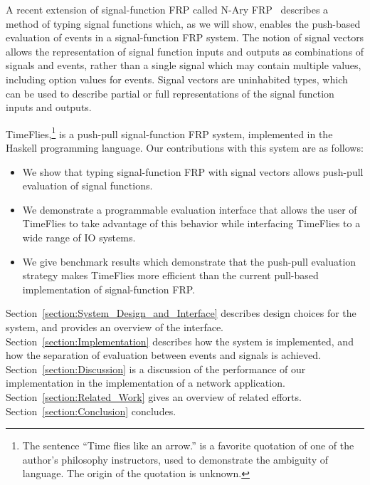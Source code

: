 A recent extension of signal-function FRP called N-Ary FRP~\cite{Sculthorpe2011}
describes a method of typing signal functions which, as we will show, enables
the push-based evaluation of events in a signal-function FRP system. The notion
of signal vectors allows the representation of signal function inputs and
outputs as combinations of signals and events, rather than a single signal which
may contain multiple values, including option values for events. Signal vectors
are uninhabited types, which can be used to describe partial or full
representations of the signal function inputs and outputs.

TimeFlies,\footnote{The sentence ``Time flies like an arrow.'' is a 
favorite quotation of one of the author's philosophy instructors, used to
demonstrate the ambiguity of language. The origin of the quotation is unknown.}
is a push-pull signal-function FRP system, implemented in the Haskell
programming language. Our contributions with this system are as follows:

\begin{itemize}
  \item We show that typing signal-function FRP with signal vectors allows
        push-pull evaluation of signal functions.
  \item We demonstrate a programmable evaluation interface that allows the user
        of TimeFlies to take advantage of this behavior while interfacing
        TimeFlies to a wide range of IO systems.
  \item We give benchmark results which demonstrate that the push-pull
        evaluation strategy makes TimeFlies more efficient than the current
        pull-based implementation of signal-function FRP.
\end{itemize}

Section~\ref{section:System_Design_and_Interface} describes design choices for
the system, and provides an overview of the interface.
Section~\ref{section:Implementation} describes how the system is implemented,
and how the separation of evaluation between events and signals is achieved.
Section~\ref{section:Discussion} is a discussion of the performance of our
implementation in the implementation of a network application. Section~\ref{section:Related_Work} gives an overview of
related efforts. Section~\ref{section:Conclusion} concludes.

